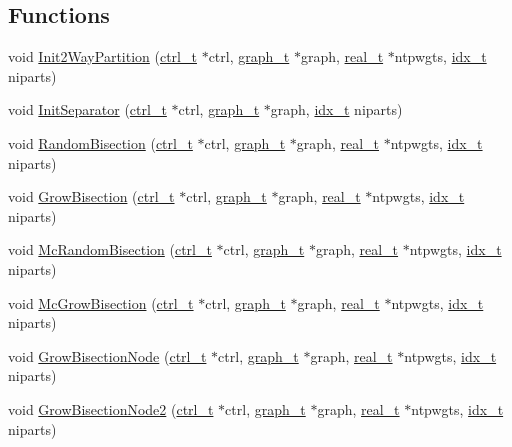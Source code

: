 \subsection*{Functions}
\begin{DoxyCompactItemize}
\item 
void \hyperlink{a00903_af566aa1abb139c5b46b29c95b9ed075d}{Init2\+Way\+Partition} (\hyperlink{a00742}{ctrl\+\_\+t} $\ast$ctrl, \hyperlink{a00734}{graph\+\_\+t} $\ast$graph, \hyperlink{a00876_a1924a4f6907cc3833213aba1f07fcbe9}{real\+\_\+t} $\ast$ntpwgts, \hyperlink{a00876_aaa5262be3e700770163401acb0150f52}{idx\+\_\+t} niparts)
\item 
void \hyperlink{a00903_a2927ed69df973d68e918bb74f75b0b70}{Init\+Separator} (\hyperlink{a00742}{ctrl\+\_\+t} $\ast$ctrl, \hyperlink{a00734}{graph\+\_\+t} $\ast$graph, \hyperlink{a00876_aaa5262be3e700770163401acb0150f52}{idx\+\_\+t} niparts)
\item 
void \hyperlink{a00903_ad9f0573a18d3fcfa45d73c3bef80e5f8}{Random\+Bisection} (\hyperlink{a00742}{ctrl\+\_\+t} $\ast$ctrl, \hyperlink{a00734}{graph\+\_\+t} $\ast$graph, \hyperlink{a00876_a1924a4f6907cc3833213aba1f07fcbe9}{real\+\_\+t} $\ast$ntpwgts, \hyperlink{a00876_aaa5262be3e700770163401acb0150f52}{idx\+\_\+t} niparts)
\item 
void \hyperlink{a00903_aa565fcd8af582579b67153287a07ea69}{Grow\+Bisection} (\hyperlink{a00742}{ctrl\+\_\+t} $\ast$ctrl, \hyperlink{a00734}{graph\+\_\+t} $\ast$graph, \hyperlink{a00876_a1924a4f6907cc3833213aba1f07fcbe9}{real\+\_\+t} $\ast$ntpwgts, \hyperlink{a00876_aaa5262be3e700770163401acb0150f52}{idx\+\_\+t} niparts)
\item 
void \hyperlink{a00903_a3ac013a2933e687d40aee2496120367e}{Mc\+Random\+Bisection} (\hyperlink{a00742}{ctrl\+\_\+t} $\ast$ctrl, \hyperlink{a00734}{graph\+\_\+t} $\ast$graph, \hyperlink{a00876_a1924a4f6907cc3833213aba1f07fcbe9}{real\+\_\+t} $\ast$ntpwgts, \hyperlink{a00876_aaa5262be3e700770163401acb0150f52}{idx\+\_\+t} niparts)
\item 
void \hyperlink{a00903_af361dc8ba850849b9230c5c7c8c8c582}{Mc\+Grow\+Bisection} (\hyperlink{a00742}{ctrl\+\_\+t} $\ast$ctrl, \hyperlink{a00734}{graph\+\_\+t} $\ast$graph, \hyperlink{a00876_a1924a4f6907cc3833213aba1f07fcbe9}{real\+\_\+t} $\ast$ntpwgts, \hyperlink{a00876_aaa5262be3e700770163401acb0150f52}{idx\+\_\+t} niparts)
\item 
void \hyperlink{a00903_a5882ab0f565a5e97581ad5c4847effbc}{Grow\+Bisection\+Node} (\hyperlink{a00742}{ctrl\+\_\+t} $\ast$ctrl, \hyperlink{a00734}{graph\+\_\+t} $\ast$graph, \hyperlink{a00876_a1924a4f6907cc3833213aba1f07fcbe9}{real\+\_\+t} $\ast$ntpwgts, \hyperlink{a00876_aaa5262be3e700770163401acb0150f52}{idx\+\_\+t} niparts)
\item 
void \hyperlink{a00903_a3668b93d256689991e65a85536f533c5}{Grow\+Bisection\+Node2} (\hyperlink{a00742}{ctrl\+\_\+t} $\ast$ctrl, \hyperlink{a00734}{graph\+\_\+t} $\ast$graph, \hyperlink{a00876_a1924a4f6907cc3833213aba1f07fcbe9}{real\+\_\+t} $\ast$ntpwgts, \hyperlink{a00876_aaa5262be3e700770163401acb0150f52}{idx\+\_\+t} niparts)
\end{DoxyCompactItemize}


